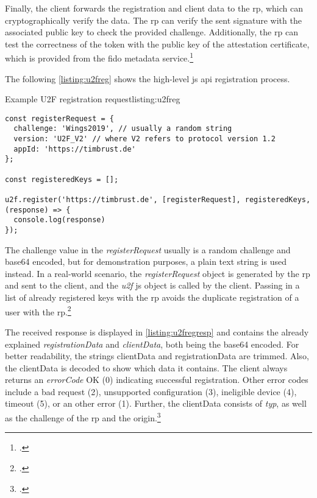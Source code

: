 Finally, the client forwards the registration and client data to the \gls{rp}, which can cryptographically verify the data. The \gls{rp} can verify the sent signature with the associated public key to check the provided challenge. Additionally, the \gls{rp} can test the correctness of the token with the public key of the attestation certificate, which is provided from the \gls{fido} metadata service.\footcites[See][3]{7860546}

The following \autoref{listing:u2freg} shows the high-level \gls{js} \gls{api} registration process.
\\
\begin{example}{Example U2F registration request}{listing:u2freg}
\begin{verbatim}
const registerRequest = {
  challenge: 'Wings2019', // usually a random string
  version: 'U2F_V2' // where V2 refers to protocol version 1.2
  appId: 'https://timbrust.de'
};

const registeredKeys = [];

u2f.register('https://timbrust.de', [registerRequest], registeredKeys, (response) => {
  console.log(response)
});
\end{verbatim}
\end{example}

The challenge value in the \textit{registerRequest} usually is a random challenge and base64 encoded, but for demonstration purposes, a plain text string is used instead. In a real-world scenario, the \textit{registerRequest} object is generated by the \gls{rp} and sent to the client, and the \textit{u2f} \gls{js} object is called by the client. Passing in a list of already registered keys with the \gls{rp} avoids the duplicate registration of a user with the \gls{rp}.\footcites[See][3]{u2f-js-api}[See][430]{10.1007/978-3-662-54970-4_25}

The received response is displayed in \autoref{listing:u2fregresp} and contains the already explained \textit{registrationData} and \textit{clientData}, both being the base64 encoded. For better readability, the strings clientData and registrationData are trimmed. Also, the clientData is decoded to show which data it contains. The client always returns an \textit{errorCode} OK (0) indicating successful registration. Other error codes include a bad request (2), unsupported configuration (3), ineligible device (4), timeout (5), or an other error (1). Further, the clientData consists of \textit{typ}, as well as the challenge of the \gls{rp} and the origin.\footcites[See][7]{u2f-js-api}[See][8]{u2f-raw-message}

